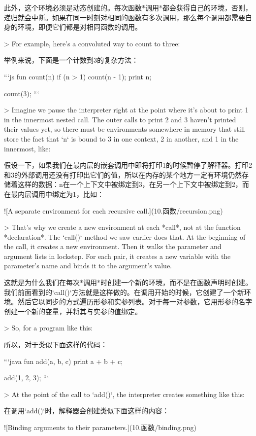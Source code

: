 \documentclass[cn,11pt,chinese]{elegantbook}
\begin{document}
{{{{{{{{此外，这个环境必须是动态创建的。每次函数*调用*都会获得自己的环境，否则，递归就会中断。如果在同一时刻对相同的函数有多次调用，那么每个调用都需要自身的环境，即便它们都是对相同函数的调用。

> For example, here’s a convoluted way to count to three:

举例来说，下面是一个计数到3的复杂方法：

```js
fun count(n) {
  if (n > 1) count(n - 1);
  print n;
}

count(3);
```

> Imagine we pause the interpreter right at the point where it’s about to print 1 in the innermost nested call. The outer calls to print 2 and 3 haven’t printed their values yet, so there must be environments somewhere in memory that still store the fact that `n` is bound to 3 in one context, 2 in another, and 1 in the innermost, like:

假设一下，如果我们在最内层的嵌套调用中即将打印1的时候暂停了解释器。打印2和3的外部调用还没有打印出它们的值，所以在内存的某个地方一定有环境仍然存储着这样的数据：n在一个上下文中被绑定到3，在另一个上下文中被绑定到2，而在最内层调用中绑定为1，比如：

![A separate environment for each recursive call.](10.函数/recursion.png)

> That’s why we create a new environment at each *call*, not at the function *declaration*. The `call()` method we saw earlier does that. At the beginning of the call, it creates a new environment. Then it walks the parameter and argument lists in lockstep. For each pair, it creates a new variable with the parameter’s name and binds it to the argument’s value.

这就是为什么我们在每次*调用*时创建一个新的环境，而不是在函数声明时创建。我们前面看到的`call()`方法就是这样做的。在调用开始的时候，它创建了一个新环境。然后它以同步的方式遍历形参和实参列表。对于每一对参数，它用形参的名字创建一个新的变量，并将其与实参的值绑定。

> So, for a program like this:

所以，对于类似下面这样的代码：

```java
fun add(a, b, c) {
  print a + b + c;
}

add(1, 2, 3);
```

> At the point of the call to `add()`, the interpreter creates something like this:

在调用`add()`时，解释器会创建类似下面这样的内容：

![Binding arguments to their parameters.](10.函数/binding.png)

}}}}}}}}
\end{document}
